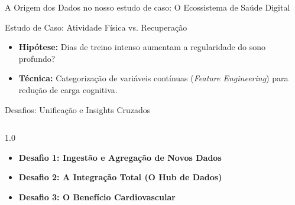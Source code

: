 \documentclass[10pt, aspectratio=169]{beamer}
\begin{document}
\begin{frame}{A Origem dos Dados no nosso estudo de caso: O Ecossistema de Saúde Digital}
\begin{center}
    \end{center}
\end{frame}

\begin{frame}{Estudo de Caso: Atividade Física vs. Recuperação}
    \begin{itemize}
        \item \textbf{Hipótese:} Dias de treino intenso aumentam a regularidade do sono profundo?
        \item \textbf{Técnica:} Categorização de variáveis contínuas (\textit{Feature Engineering}) para redução de carga cognitiva.
    \end{itemize}
\end{frame}


\begin{frame}{Desafios: Unificação e Insights Cruzados}
    \begin{columns}
        \begin{column}{1.0\textwidth}
            
            \begin{itemize}
                \item \textbf{Desafio 1: Ingestão e Agregação de Novos Dados}
                \item \textbf{Desafio 2: A Integração Total (O Hub de Dados)}
                \item \textbf{Desafio 3: O Benefício Cardiovascular}
            \end{itemize}
        \end{column}
    \end{columns}
\end{frame}
\end{document}
